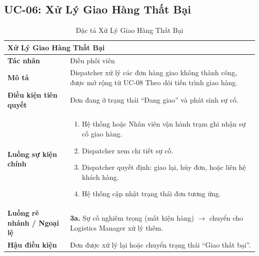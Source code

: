 \subsection{UC-06: Xử Lý Giao Hàng Thất Bại}
\begin{table}[H]
  \centering
  \begin{tabularx}{\textwidth}{|l|X|}
    \hline
    \multicolumn{2}{|l|}{\textbf{Xử Lý Giao Hàng Thất Bại}} \\
    \hline
    \textbf{Tác nhân}           & Điều phối viên \\ \hline
    \textbf{Mô tả}              & Dispatcher xử lý các đơn hàng giao không thành công, được mở rộng từ UC-08 Theo dõi tiến trình giao hàng. \\ \hline
    \textbf{Điều kiện tiên quyết} & Đơn đang ở trạng thái ``Đang giao'' và phát sinh sự cố. \\ \hline
    \textbf{Luồng sự kiện chính} &
      \begin{enumerate}[leftmargin=*, nosep, topsep=0pt]
        \item Hệ thống hoặc Nhân viên vận hành trạm ghi nhận sự cố giao hàng.
        \item Dispatcher xem chi tiết sự cố.
        \item Dispatcher quyết định: giao lại, hủy đơn, hoặc liên hệ khách hàng.
        \item Hệ thống cập nhật trạng thái đơn tương ứng.
      \end{enumerate} \\ \hline
    \textbf{Luồng rẽ nhánh / Ngoại lệ} &
      \textbf{3a.} Sự cố nghiêm trọng (mất kiện hàng) $\rightarrow$ chuyển cho Logistics Manager xử lý thêm. \\ \hline
    \textbf{Hậu điều kiện}      & Đơn được xử lý lại hoặc chuyển trạng thái ``Giao thất bại''. \\
    \hline
  \end{tabularx}
  \caption{Đặc tả Xử Lý Giao Hàng Thất Bại}
  \label{tab:uc06}
\end{table}

